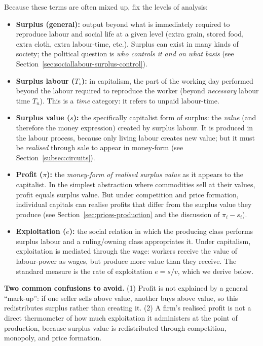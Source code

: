 Because these terms are often mixed up, fix the levels of analysis:

\begin{itemize}[leftmargin=1.5em]
  \item \textbf{Surplus (general):} output beyond what is immediately required to reproduce labour and social life
  at a given level (extra grain, stored food, extra cloth, extra labour-time, etc.). Surplus can exist in many
  kinds of society; the political question is \emph{who controls it and on what basis} (see Section~\ref{sec:sociallabour-surplus-control}). 

  \item \textbf{Surplus labour (\(T_s\)):} in capitalism, the part of the working day performed beyond the labour
  required to reproduce the worker (beyond \emph{necessary} labour time \(T_n\)). This is a \emph{time} category:
  it refers to unpaid labour-time.

  \item \textbf{Surplus value (\(s\)):} the specifically capitalist form of surplus: the \emph{value} (and therefore
  the money expression) created by surplus labour. It is produced in the labour process, because only living labour
  creates new value; but it must be \emph{realised} through sale to appear in money-form (see Section~\ref{subsec:circuits}).

  \item \textbf{Profit (\(\pi\)):} the \emph{money-form of realised surplus value} as it appears to the capitalist.
  In the simplest abstraction where commodities sell at their values, profit equals surplus value. But under
  competition and price formation, individual capitals can realise profits that differ from the surplus value they
  produce (see Section~\ref{sec:prices-production} and the discussion of \(\pi_i - s_i\)).

  \item \textbf{Exploitation (\(e\)):} the social relation in which the producing class performs surplus labour and a
  ruling/owning class appropriates it. Under capitalism, exploitation is mediated through the wage: workers receive
  the value of labour-power as wages, but produce more value than they receive. The standard measure is the rate of
  exploitation \(e = s/v\), which we derive below.
\end{itemize}

\noindent
\textbf{Two common confusions to avoid.} (1) Profit is not explained by a general ``mark-up'': if one seller sells
above value, another buys above value, so this redistributes surplus rather than creating it. (2) A firm’s realised
profit is not a direct thermometer of how much exploitation it administers at the point of production, because
surplus value is redistributed through competition, monopoly, and price formation.


